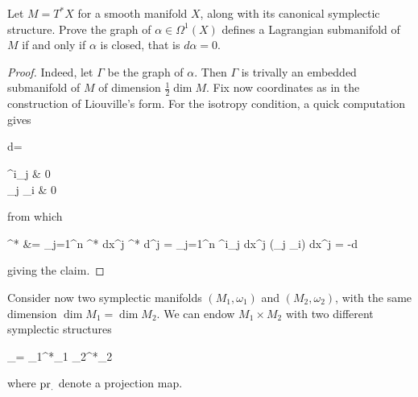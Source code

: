\documentclass[main.tex]{subfiles}
\begin{document}
\begin{exercise}
\label{ex:lagrangian_submanifolds_of_cotangent_bundles}
	Let $M = T^*X$ for a smooth manifold $X$, along with its canonical symplectic structure. Prove the graph of $\alpha \in \Omega^1(X)$ defines a Lagrangian submanifold of $M$ if and only if $\alpha$ is closed, that is $d\alpha =0$.
\end{exercise}
\begin{proof}
	Indeed, let $\Gamma$ be the graph of $\alpha$. Then $\Gamma$ is trivally an embedded submanifold of $M$ of dimension $\frac12 \dim M$. Fix now coordinates as in the construction of Liouville's form. For the isotropy condition, a quick computation gives
	\begin{eqalign}
		d\iota = \begin{pmatrix}
			\delta^i_j & 0\\
			\partial_j \alpha_i & 0
		\end{pmatrix}
	\end{eqalign}
	from which
	\begin{eqalign}
		\iota^* \omega &= \sum_{j=1}^n \iota^* dx^j \wedge \iota^* d\xi^j = \sum_{j=1}^n \delta^i_j dx^j \wedge (\partial_j \alpha_i) dx^j = -d\alpha
	\end{eqalign}
	giving the claim.
\end{proof}

Consider now two symplectic manifolds $(M_1,\omega_1)$ and $(M_2, \omega_2)$, with the same dimension $\dim M_1 = \dim M_2$. We can endow $M_1 \times M_2$ with two different symplectic structures
\begin{eqalign}
	\omega_\pm = \pr_1^*\omega_1 \pm \pr_2^*\omega_2
\end{eqalign}
where $\mathrm{pr}_.$ denote a projection map.
\end{document}
